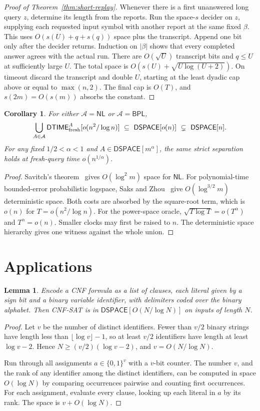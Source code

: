 \documentclass[11pt]{article}
\newtheorem{lemma}[theorem]{Lemma}
\newtheorem{corollary}[theorem]{Corollary}
\theoremstyle{remark}
\newcommand{\DTIME}{\mathsf{DTIME}}
\newcommand{\DSPACE}{\mathsf{DSPACE}}
\newcommand{\SAT}{\textup{\textsc{CNF-SAT}}}
\begin{document}
\begin{proof}[Proof of Theorem~\ref{thm:short-replay}]
Whenever there is a first unanswered long query $z$, determine its
length from the reports. Run the space-$s$ decider on $z$, supplying
each requested input symbol with another report at the same fixed
$\beta$. This uses $O(s(U)+q+s(q))$ space plus the transcript. Append
one bit only after the decider returns. Induction on $|\beta|$ shows
that every completed answer agrees with the actual run. There are
$O(\sqrt U)$ transcript bits and $q\le U$ at sufficiently large $U$.
The total space is $O(s(U)+\sqrt{U\log(U+2)})$. On timeout discard
the transcript and double $U$, starting at the least dyadic cap
above or equal to $\max(n,2)$. The final cap is $O(T)$, and
$s(2m)=O(s(m))$ absorbs the constant.
\end{proof}

\begin{corollary}\label{cor:small-oracles}
For either $\mathcal A=\mathsf{NL}$ or $\mathcal A=\mathsf{BPL}$,
\[
 \bigcup_{A\in\mathcal A}\DTIME_{\rm fresh}^A[o(n^2/\log n)]
 \ \subseteq\ \DSPACE[o(n)]\ \subsetneq\ \DSPACE[n].
\]
For any fixed $1/2<\alpha<1$ and $A\in\DSPACE[m^\alpha]$, the same
strict separation holds at fresh-query time $o(n^{1/\alpha})$.
\end{corollary}
\begin{proof}
Savitch's theorem~\cite{Savitch} gives $O(\log^2 m)$ space for
$\mathsf{NL}$. For polynomial-time bounded-error probabilistic
logspace, Saks and Zhou~\cite{SaksZhou} give $O(\log^{3/2}m)$
deterministic space. Both costs are absorbed by the square-root
term, which is $o(n)$ for $T=o(n^2/\log n)$. For the power-space
oracle, $\sqrt{T\log T}=o(T^\alpha)$ and $T^\alpha=o(n)$.
Smaller clocks may first be raised to $n$. The deterministic
space hierarchy gives one witness against the whole union.
\end{proof}

\section{Applications}
\begin{lemma}\label{lem:sat}
Encode a CNF formula as a list of clauses, each literal given by a sign
bit and a binary variable identifier, with delimiters coded over the
binary alphabet. Then \SAT{} is in $\DSPACE[O(N/\log N)]$ on inputs of
length $N$.
\end{lemma}
\begin{proof}
Let $v$ be the number of distinct identifiers. Fewer than $v/2$ binary
strings have length less than $\lfloor\log v\rfloor-1$, so at least $v/2$
identifiers have length at least $\log v-2$. Hence $N\ge(v/2)(\log v-2)$,
and $v=O(N/\log N)$.

Run through all assignments $a\in\{0,1\}^v$ with a $v$-bit counter. The
number $v$, and the rank of any identifier among the distinct
identifiers, can be computed in space $O(\log N)$ by comparing
occurrences pairwise and counting first occurrences. For each assignment,
evaluate every clause, looking up each literal in $a$ by its rank. The
space is $v+O(\log N)$.
\end{proof}
\end{document}
